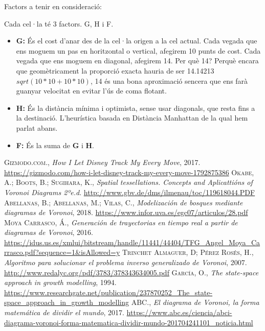 \documentclass[12pt]{article}
\begin{document}
Factors a tenir en consideració:

Cada cel·la té 3 factors. G, H i F.

\begin{itemize}
	\item \textbf{G:} És el cost d'anar des de la cel·la origen a la cel actual. Cada vegada que ens moguem un pas en horitzontal o vertical, afegirem 10 punts de cost. Cada vegada que ens moguem en diagonal, afegirem 14. Per què 14? Perquè encara que geomètricament la proporció exacta hauria de ser 14.14213 $sqrt (10 * 10 + 10 * 10)$, 14 és una bona aproximació sencera que ens farà guanyar velocitat en evitar l'ús de coma flotant.

	\item \textbf{H:} És la distància mínima i optimista, sense usar diagonals, que resta fins a la destinació. L'heurística basada en Distància Manhattan de la qual hem parlat abans.

	\item \textbf{F:} És la suma de \textbf{G} i \textbf{H}.
\end{itemize}
\clearpage
\begin{thebibliography}{9}
 \textsc{Gizmodo.com.}, \textit{How I Let Disney Track My Every Move}, 2017. \textcolor{blue}{\url{https://gizmodo.com/how-i-let-disney-track-my-every-move-1792875386}}	
 \textsc{Okabe, A.}; \textsc{Boots, B.}; \textsc{Sugihara, K.}, \textit{Spatial tessellations. Concepts and Aplicattións of \textit{Voronoi} Diagrams 2ºe.d}. \textcolor{blue}{\url{http://www.gbv.de/dms/ilmenau/toc/119618044.PDF}}
 \textsc{Abellanas, B.}; \textsc{Abellanas, M.}; \textsc{Vilas, C.}, \textit{Modelización de bosques mediante diagramas de \textit{Voronoi}}, 2018. \textcolor{blue}{\url{https://www.infor.uva.es/egc07/articulos/28.pdf}}
 \textsc{Moya Carrasco, Á.}, \textit{Generación de trayectorias en tiempo real a partir de diagramas de \textit{Voronoi}}, 2016. \textcolor{blue}{\url{https://idus.us.es/xmlui/bitstream/handle/11441/44404/TFG_Angel_Moya_Carrasco.pdf?sequence=1&isAllowed=y}}
 \textsc{Trinchet Almaguer, D}; \textsc{Pérez Rosés, H.}, \textit{Algoritmo para solucionar el problema inverso generalizado de \textit{Voronoi}}, 2007. \textcolor{blue}{\url{http://www.redalyc.org/pdf/3783/378343634005.pdf}}
 \textsc{García, O.}, \textit{The state-space approach in growth modelling}, 1994. \textcolor{blue}{\url{https://www.researchgate.net/publication/237870252_The_state-space_approach_in_growth_modelling}}
 \textsc{ABC.}, \textit{El diagrama de \textit{Voronoi}, la forma matemática de dividir el mundo}, 2017. \textcolor{blue}{\url{https://www.abc.es/ciencia/abci-diagrama-voronoi-forma-matematica-dividir-mundo-201704241101_noticia.html}}
\end{thebibliography}
\end{document}
